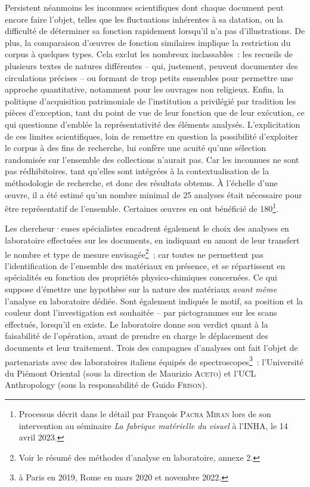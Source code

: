 \documentclass[a4paper,12pt, twoside]{book}
\begin{document}
Persistent néanmoins les inconnues scientifiques dont chaque document peut encore faire l’objet, telles que les fluctuations inhérentes à sa datation, ou la difficulté de déterminer sa fonction rapidement lorsqu’il n’a pas d’illustrations. De plus, la comparaison d’œuvres de fonction similaires implique la restriction du corpus à quelques types. Cela exclut les nombreux inclassables~: les recueils de plusieurs textes de natures différentes – qui, justement, peuvent documenter des circulations précises – ou formant de trop petits ensembles pour permettre une approche quantitative, notamment pour les ouvrages non religieux. Enfin, la politique d’acquisition patrimoniale de l’institution a privilégié par tradition les pièces d’exception, tant du point de vue de leur fonction que de leur exécution, ce qui questionne d’emblée la représentativité des éléments analysés. L’explicitation de ces limites scientifiques, loin de remettre en question la possibilité d’exploiter le corpus à des fins de recherche, lui confère une acuité qu’une sélection randomisée sur l’ensemble des collections n’aurait pas. Car les inconnues ne sont pas rédhibitoires, tant qu’elles sont intégrées à la contextualisation de la méthodologie de recherche, et donc des résultats obtenus. À l’échelle d’une œuvre, il a été estimé qu’un nombre minimal de 25 analyses était nécessaire pour être représentatif de l’ensemble. Certaines œuvres en ont bénéficié de 180\footnote{Processus décrit dans le détail par François \textsc{Pacha Miran} lors de son intervention au séminaire \textit{La fabrique matérielle du visuel} à l’INHA, le 14 avril 2023.}.

Les chercheur·euses spécialistes encadrent également le choix des analyses en laboratoire effectuées sur les documents, en indiquant en amont de leur transfert le nombre et type de mesure envisagée\footnote{Voir le résumé des méthodes d’analyse en laboratoire, annexe 2.}~; car toutes ne permettent pas l’identification de l’ensemble des matériaux en présence, et se répartissent en spécialités en fonction des propriétés physico-chimiques concernées. Ce qui suppose d’émettre une hypothèse sur la nature des matériaux \textit{avant même} l’analyse en laboratoire dédiée. Sont également indiqués le motif, sa position et la couleur dont l’investigation est souhaitée – par pictogrammes sur les scans effectués, lorsqu’il en existe. Le laboratoire donne son verdict quant à la faisabilité de l’opération, avant de prendre en charge le déplacement des documents et leur traitement. Trois des campagnes d’analyses ont fait l’objet de partenariats avec des laboratoires italiens équipés de spectroscopes\footnote{à Paris en 2019, Rome en mars 2020 et novembre 2022.}~: l’Université du Piémont Oriental (sous la direction de Maurizio \textsc{Aceto}) et l’UCL Anthropology (sous la responsabilité de Guido \textsc{Frison}).
\end{document}
